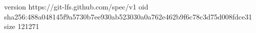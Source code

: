 version https://git-lfs.github.com/spec/v1
oid sha256:488a048145f9a5730b7ee930ab523030a0a762e462b9f6c78c3d75d008fdce31
size 121271
